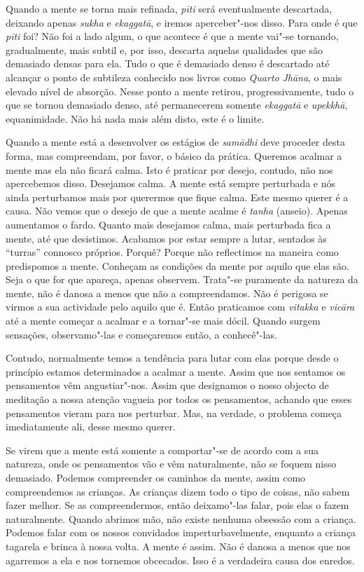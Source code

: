 Quando a mente se torna mais refinada, \emph{pīti} será eventualmente
descartada, deixando apenas \emph{sukha} e \emph{ekaggatā}, e iremos
aperceber"-nos disso. Para onde é que \emph{pīti} foi? Não foi a lado
algum, o que acontece é que a mente vai"-se tornando, gradualmente, mais
subtil e, por isso, descarta aquelas qualidades que são demasiado densas
para ela. Tudo o que é demasiado denso é descartado até alcançar o ponto
de subtileza conhecido nos livros como \emph{Quarto} \emph{Jhāna}, o
mais elevado nível de absorção. Nesse ponto a mente retirou,
progressivamente, tudo o que se tornou demasiado denso, até permanecerem
somente \emph{ekaggatā} e \emph{upekkhā}, equanimidade. Não há nada mais
além disto, este é o limite.

Quando a mente está a desenvolver os estágios de \emph{samādhi} deve
proceder desta forma, mas compreendam, por favor, o básico da prática.
Queremos acalmar a mente mas ela não ficará calma. Isto é praticar por
desejo, contudo, não nos apercebemos disso. Desejamos calma. A mente
está sempre perturbada e nós ainda perturbamos mais por querermos que
fique calma. Este mesmo querer é a causa. Não vemos que o desejo de que
a mente acalme é \emph{tanha} (anseio). Apenas aumentamos o fardo.
Quanto mais desejamos calma, mais perturbada fica a mente, até que
desistimos. Acabamos por estar sempre a lutar, sentados às ``turras''
connosco próprios. Porquê? Porque não reflectimos na maneira como
predispomos a mente. Conheçam as condições da mente por aquilo que elas
são. Seja o que for que apareça, apenas observem. Trata"-se puramente da
natureza da mente, não é danosa a menos que não a compreendamos. Não é
perigosa se virmos a sua actividade pelo aquilo que é. Então praticamos
com \emph{vitakka} e \emph{vicāra} até a mente começar a acalmar e a
tornar"-se mais dócil. Quando surgem sensações, observamo"-las e
começaremos então, a conhecê"-las.

Contudo, normalmente temos a tendência para lutar com elas porque desde
o princípio estamos determinados a acalmar a mente. Assim que nos
sentamos os pensamentos vêm angustiar"-nos. Assim que designamos o nosso
objecto de meditação a nossa atenção vagueia por todos os pensamentos,
achando que esses pensamentos vieram para nos perturbar. Mas, na
verdade, o problema começa imediatamente ali, desse mesmo querer.

Se virem que a mente está somente a comportar"-se de acordo com a sua
natureza, onde os pensamentos vão e vêm naturalmente, não se foquem
nisso demasiado. Podemos compreender os caminhos da mente, assim como
compreendemos as crianças. As crianças dizem todo o tipo de coisas, não
sabem fazer melhor. Se as compreendermos, então deixamo"-las falar, pois
elas o fazem naturalmente. Quando abrimos mão, não existe nenhuma
obsessão com a criança. Podemos falar com os nossos convidados
imperturbavelmente, enquanto a criança tagarela e brinca à nossa volta.
A mente é assim. Não é danosa a menos que nos agarremos a ela e nos
tornemos obcecados. Isso é a verdadeira causa dos enredos.

